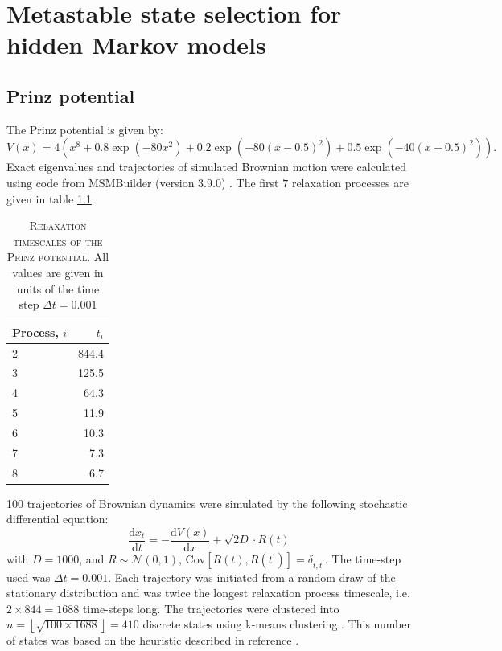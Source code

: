 \chapter{Metastable state selection for hidden Markov models}\label{app:hmm}

\section{Prinz potential}

 The Prinz potential is given by: 
\begin{equation}\label{eqn:prinz_pot}
 V(x) = 4\left(x^8 + 0.8 \exp{\left(-80 x^2\right)} + 0.2 \exp{\left(-80 (x-0.5)^2\right)} + 0.5\exp{\left(-40 (x+0.5)^2\right)}\right).
\end{equation}
Exact eigenvalues and trajectories of simulated Brownian motion were calculated using code from MSMBuilder (version 3.9.0) \cite{beauchampMSMBuilder2ModelingConformational2011} . The first $7$ relaxation processes are given in table \ref{tab:prinz_its_exact}. 
\begin{table}
 \centering
 \caption[Relaxation timescales of the Prinz potential]{\textsc{Relaxation timescales of the Prinz potential}. All values are given in units of the time step $\Delta t = 0.001$}
 \begin{tabular}{lr}
 \toprule
 Process, $i$ & $t_i$ \\
 \midrule
  2 & 844.4 \\
  3 & 125.5 \\
  4 & 64.3 \\
  5 & 11.9 \\
  6 & 10.3 \\
  7 & 7.3 \\
  8 & 6.7 \\
  \bottomrule
 \end{tabular}
 \label{tab:prinz_its_exact}
\end{table}

\num{100} trajectories of Brownian dynamics were simulated by the following stochastic differential equation: 
\begin{equation}\label{eqn:prinz_dynamics}
 \frac{\mathrm{d}x_t}{\mathrm{d}t} = -\frac{\mathrm{d}V(x)}{\mathrm{d}x} + \sqrt{2D}\cdot R(t)
\end{equation}
with $D = 1000$, and $R\sim \mathcal{N}(0, 1)$, $\mathrm{Cov}\left[R(t), R(t^{\prime})\right]=\delta_{t, t^{\prime}}$. The time-step used was $\Delta t = 0.001$. Each trajectory was initiated from a random draw of the stationary distribution and was twice the longest relaxation process timescale, i.e. $2\times 844=1688$ time-steps long. The trajectories were clustered into $n = \left\lfloor\sqrt{100\times 1688}\right\rfloor =410$ discrete states using k-means clustering \cite{friedman2001elements}. This number of states was based on the heuristic described in reference \cite{husicWardClusteringImproves2017a}.

